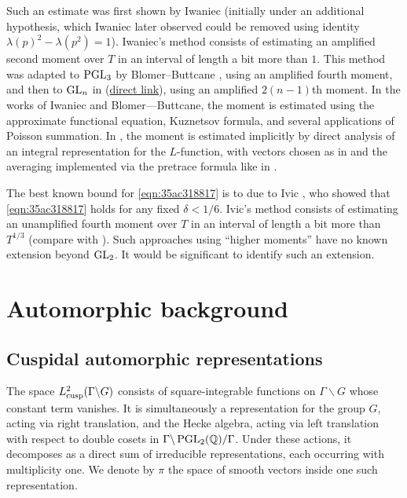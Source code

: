 \documentclass[reqno]{amsart} 
\numberwithin{equation}{section}
\numberwithin{theorem}{section}
\begin{document}
Such an estimate was first shown by Iwaniec \cite{Iwaniec1992} (initially under an additional hypothesis, which Iwaniec later observed could be removed using identity $\lambda(p)^2 - \lambda(p^2) = 1$).  Iwaniec's method consists of estimating an amplified second moment over $T$ in an interval of length a bit more than $1$.  This method was adapted to $\operatorname{PGL}_3$ by Blomer--Buttcane \cite{MR4203038, MR4039487}, using an amplified fourth moment, and then to $\operatorname{GL}_n$ in \cite{2021arXiv210915230N}  (\href{standard.pdf}{direct link}), using an amplified $2(n-1)$th moment.  In the works of Iwaniec and Blomer---Buttcane, the moment is estimated using the approximate functional equation, Kuznetsov formula, and several applications of Poisson summation.  In \cite{2021arXiv210915230N}, the moment is estimated implicitly by direct analysis of an integral representation for the $L$-function, with vectors chosen as in \cite{nelson-venkatesh-1} and the averaging implemented via the pretrace formula like in \cite{iwan-sar}.

\begin{remark}
  The best known bound for \eqref{eqn:35ac318817} is to due to Ivic \cite{MR1879668} , who showed that \eqref{eqn:35ac318817} holds for any fixed $\delta < 1/6$.  Ivic's method consists of estimating an unamplified fourth moment over $T$ in an interval of length a bit more than $T^{1/3}$ (compare with \cite{michel-2009, Nelson-EisCubic, 2021arXiv210112106B, balkanova2022weyls}).  Such approaches using ``higher moments'' have no known extension beyond $\operatorname{GL}_2$.  It would be significant to identify such an extension.
\end{remark}

\section{Automorphic background}\label{sec:35ac3e5876}

\subsection{Cuspidal automorphic representations}\label{sec:35ac3e5878}
The space $L^2_{\operatorname{cusp}}(\Gamma \backslash G)$ consists of square-integrable functions on $\Gamma \backslash G$ whose constant term vanishes.  It is simultaneously a representation for the group $G$, acting via right translation, and the Hecke algebra, acting via left translation with respect to double cosets in $\Gamma \backslash \operatorname{PGL}_2(\mathbb{Q}) / \Gamma$.  Under these actions, it decomposes as a direct sum of irreducible representations, each occurring with multiplicity one.  We denote by $\pi$ the space of smooth vectors inside one such representation.
\end{document}
